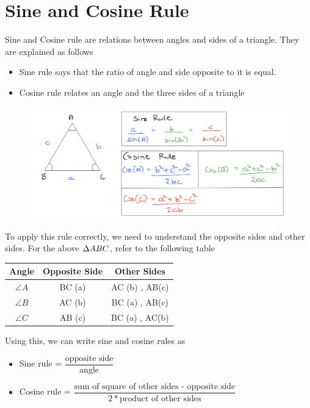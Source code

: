 \section{Sine and Cosine Rule}
Sine and Cosine rule are relations between angles and sides of a triangle. They are explained as follows
\begin{itemize}
    \item Sine rule says that the ratio of angle and side opposite to it is equal.
    \item Cosine rule relates an angle and the three sides of a triangle 
\end{itemize}

\begin{figure}[h!]
    \centering
    \includegraphics[width=1\linewidth]{Quant//Geometry//Images//Triangles/triangles_10_sine_and_cosine_rule.png}
\end{figure}

To apply this rule correctly, we need to understand the opposite sides and other sides. For the above $\Delta {ABC}$, refer to the following table

\begin{table}[h!]
    \centering
    \begin{tabular}{|| c | c | c ||}
        \hline
         Angle & Opposite Side & Other Sides  \\
        \hline
         $\angle{A}$ & BC (a) & AC (b) , AB(c) \\ 
        \hline
         $\angle{B}$ & AC (b) & BC (a) , AB(c) \\ 
        \hline
         $\angle{C}$ & AB (c) & BC (a) , AC(b) \\ 
        \hline
    \end{tabular}
\end{table}

Using this, we can write sine and cosine rules as
\begin{itemize}
    \item Sine rule = $\dfrac{\text{opposite side}}{\text{angle}}$

    \item Cosine rule = $\dfrac{\text{sum of square of other sides - opposite side}}{2 * \text{product of other sides}}$
\end{itemize}

